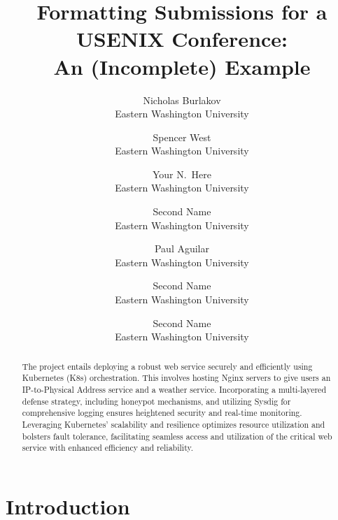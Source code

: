 \documentclass[letterpaper,twocolumn,10pt]{article}
\begin{document}

\date{}

\title{\Large \bf Formatting Submissions for a USENIX Conference:\\
  An (Incomplete) Example}

\author{
{\rm Nicholas Burlakov}\\
Eastern Washington University
\and
{\rm Spencer West}\\
Eastern Washington University
\and
{\rm Your N.\ Here}\\
Eastern Washington University
\and
{\rm Second Name}\\
Eastern Washington University
\and
{\rm Paul Aguilar}\\
Eastern Washington University
\and
{\rm Second Name}\\
Eastern Washington University
\and
{\rm Second Name}\\
Eastern Washington University
} %

\maketitle

\begin{abstract}
The project entails deploying a robust web service securely and efficiently using Kubernetes (K8s) orchestration. This involves hosting Nginx servers to give users an IP-to-Physical Address service and a weather service. Incorporating a multi-layered defense strategy, including honeypot mechanisms, and utilizing Sysdig for comprehensive logging ensures heightened security and real-time monitoring. Leveraging Kubernetes' scalability and resilience optimizes resource utilization and bolsters fault tolerance, facilitating seamless access and utilization of the critical web service with enhanced efficiency and reliability.
\end{abstract}


\section{Introduction}

\end{document}
